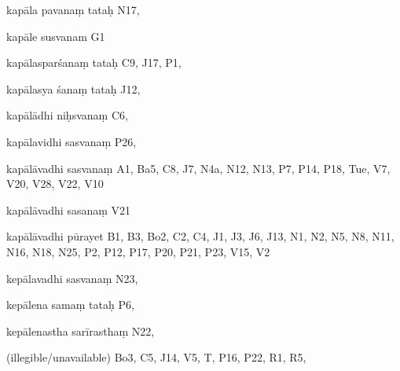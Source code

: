 \begin{marma}[hp02_009]
\begin{marma}[hp02_011]
\begin{marma}[hp02_62b]
\item[kapāla pavanaṃ tataḥ] N17,
\item[kapāle susvanam] G1
\item[kapālasparśanaṃ tataḥ] C9, J17, P1,
\item[kapālasya śanaṃ tataḥ] J12,
\item[kapālādhi niḥsvanaṃ] C6,
\item[kapālavidhi sasvanaṃ] P26,
\item[kapālāvadhi sasvanaṃ] A1, Ba5, C8, J7, N4a, N12, N13, P7, P14, P18, Tue, V7, V20, V28, V22, V10
\item[kapālāvadhi sasanaṃ] V21
\item[kapālāvadhi pūrayet] B1, B3, Bo2, C2, C4, J1, J3, J6, J13, N1, N2, N5, N8, N11, N16, N18, N25, P2, P12, P17, P20, P21, P23, V15, V2
\item[kepālavadhi sasvanaṃ] N23, 
\item[kepālena samaṃ tataḥ] P6, 
\item[kepālenastha sarīrasthaṃ] N22,
 \item[(illegible/unavailable)] Bo3, C5, J14, V5, T, P16, P22, R1, R5,
  \begin{description}

    \end{description}
 \end{marma}


\end{marma}
\end{marma}
